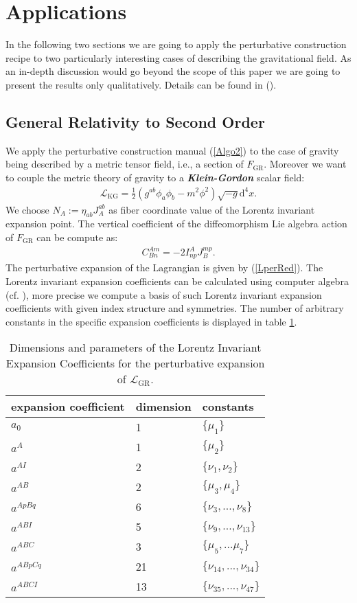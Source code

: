 \documentclass[%
 reprint,
nofootinbib,
 amsmath,amssymb,
 aps,
 prd,
floatfix,
]{revtex4-2}
\begin{document}
\section{Applications}
In the following two sections we are going to apply the perturbative construction recipe to two particularly interesting cases of describing the gravitational field. 
As an in-depth discussion would go beyond the scope of this paper we are going to present the results only qualitatively. Details can be found in (\cite{TobiMaster}).
\subsection{General Relativity to Second Order}
We apply the perturbative construction manual (\ref{Algo2}) to the case of gravity being described by a metric tensor field, i.e., a section of $F_{\text{GR}}$. 
Moreover we want to couple the metric theory of gravity to a \textit{\textbf{Klein-Gordon}} scalar field:
\begin{align}\label{KGL}
    \mathcal{L}_{\text{KG}} = \frac{1}{2} \left ( g^{ab} \phi_a \phi_b - m^2 \phi^2\right )\sqrt{-g} \mathrm{d}^4x.
\end{align}
We choose $N_A := \eta_{ab} J_A^{ab} $ as fiber coordinate value of the Lorentz invariant expansion point. The vertical coefficient of the diffeomorphism Lie algebra action of $F_{\text{GR}}$ can be compute as:
\begin{align}
    C^{Am}_{Bn} = -2 I^A_{np} J_B^{mp}.
\end{align}
The perturbative expansion of the Lagrangian is given by (\ref{LperRed}).
The Lorentz invariant expansion coefficients can be calculated using computer algebra (cf. \cite{sparse-tensor}), more precise we compute a basis of such Lorentz invariant expansion coefficients with given index structure and symmetries. The number of arbitrary constants in the
specific expansion coefficients is displayed in table \ref{GRExp}.
\begin{table}
\centering 
\begin{tabular}{lll}\toprule
    expansion coefficient & dimension & constants   \\ \midrule
    $a_0$ & 1 & $\{\mu_1\}$ \\
    $a^A$ & 1 & $\{\mu_2\}$ \\
    $a^{AI}$ & 2 & $\{\nu_1, \nu_2\}$ \\
    $a^{AB}$ & 2 & $\{\mu_3, \mu_4 \} $ \\
    $a^{ApBq}$ & 6 & $\{\nu_3,...,\nu_8\}$ \\
    $a^{ABI}$ & 5 & $\{ \nu_9,...,\nu_{13} \}$ \\
    $a^{ABC}$ & 3 & $\{ \mu_5,...\mu_7 \}$\\
    $a^{ABpCq}$ & 21 & $\{\nu_{14},...,\nu_{34} \}$ \\
    $a^{ABCI}$ & 13 & $\{ \nu_{35},...,\nu_{47}\}$\\ \bottomrule
\end{tabular}
\caption{Dimensions and parameters of the Lorentz Invariant Expansion Coefficients for the perturbative expansion of $\mathcal{L}_{\text{GR}}$.}\label{GRExp}
\end{table}
\end{document}
